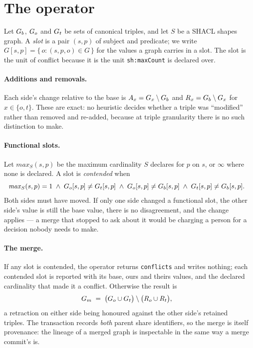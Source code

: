 \section{The operator}
\label{sec:operator}

Let $G_{b}$, $G_{o}$ and $G_{t}$ be sets of canonical triples, and let $S$ be a
SHACL shapes graph. A \emph{slot} is a pair $(s, p)$ of subject and predicate;
we write $G[s,p] = \{\, o : (s,p,o) \in G \,\}$ for the values a graph carries in
a slot. The slot is the unit of conflict because it is the unit
\texttt{sh:maxCount} is declared over.

\paragraph{Additions and removals.} Each side's change relative to the base is
$A_x = G_x \setminus G_{b}$ and $R_x = G_{b} \setminus G_x$ for $x \in
\{o, t\}$. These are exact: no heuristic decides whether a triple was
``modified'' rather than removed and re-added, because at triple granularity
there is no such distinction to make.

\paragraph{Functional slots.} Let $\mathit{max}_S(s,p)$ be the maximum
cardinality $S$ declares for $p$ on $s$, or $\infty$ where none is declared. A
slot is \emph{contended} when
\[
  \mathit{max}_S(s,p) = 1
  \;\wedge\;
  G_{o}[s,p] \neq G_{t}[s,p]
  \;\wedge\;
  G_{o}[s,p] \neq G_{b}[s,p]
  \;\wedge\;
  G_{t}[s,p] \neq G_{b}[s,p].
\]
Both sides must have moved. If only one side changed a functional slot, the
other side's value is still the base value, there is no disagreement, and the
change applies --- a merge that stopped to ask about it would be charging a
person for a decision nobody needs to make.

\paragraph{The merge.} If any slot is contended, the operator returns
\texttt{conflicts} and writes nothing; each contended slot is reported with its
base, ours and theirs values, and the declared cardinality that made it a
conflict. Otherwise the result is
\[
  G_m \;=\; \bigl( G_{o} \cup G_{t} \bigr) \setminus \bigl( R_o \cup R_t \bigr),
\]
a retraction on either side being honoured against the other side's retained
triples. The transaction records \emph{both} parent share identifiers, so the
merge is itself provenance: the lineage of a merged graph is inspectable in the
same way a merge commit's is.

